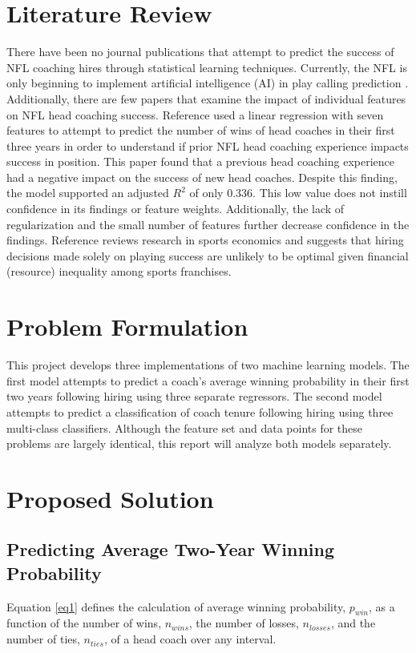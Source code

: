\documentclass[conference]{IEEEtran}
\begin{document}
\section{Literature Review}
There have been no journal publications that attempt to predict the success of NFL coaching hires through statistical learning techniques. Currently, the NFL is only beginning to implement artificial intelligence (AI) in play calling prediction \cite{b4}. Additionally, there are few papers that examine the impact of individual features on NFL head coaching success. Reference \cite{b5} used a linear regression with seven features to attempt to predict the number of wins of head coaches in their first three years in order to understand if prior NFL head coaching experience impacts success in position. This paper found that a previous head coaching experience had a negative impact on the success of new head coaches. Despite this finding, the model supported an adjusted $R^2$ of only $0.336$. This low value does not instill confidence in its findings or feature weights. Additionally, the lack of regularization and the small number of features further decrease confidence in the findings. Reference \cite{b6} reviews research in sports economics and suggests that hiring decisions made solely on playing success are unlikely to be optimal given financial (resource) inequality among sports franchises. 

\section{Problem Formulation}
This project develops three implementations of two machine learning models. The first model attempts to predict a coach's average winning probability in their first two years following hiring using three separate regressors. The second model attempts to predict a classification of coach tenure following hiring using three multi-class classifiers. Although the feature set and data points for these problems are largely identical, this report will analyze both models separately.

\section{Proposed Solution}

\subsection{Predicting Average Two-Year Winning Probability}
Equation \eqref{eq1} defines the calculation of average winning probability, $p_{win}$, as a function of the number of wins, $n_{wins}$, the number of losses, $n_{losses}$, and the number of ties, $n_{ties}$, of a head coach over any interval. 
\end{document}
